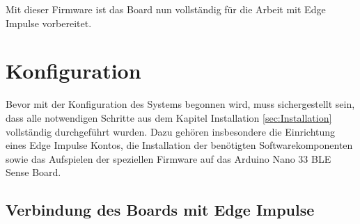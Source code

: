 Mit dieser Firmware ist das Board nun vollständig für die Arbeit mit Edge Impulse vorbereitet. \cite{ArduinoEdgeImpulse:2025}



\chapter{Konfiguration} \label{sec:Konfiguration}

Bevor mit der Konfiguration des Systems begonnen wird, muss sichergestellt sein, dass alle notwendigen Schritte aus dem Kapitel Installation \ref{sec:Installation} vollständig durchgeführt wurden. Dazu gehören insbesondere die Einrichtung eines Edge Impulse Kontos, die Installation der benötigten Softwarekomponenten sowie das Aufspielen der speziellen Firmware auf das Arduino Nano 33 BLE Sense Board. \cite{ArduinoEdgeImpulse:2025}

\section{Verbindung des Boards mit Edge Impulse}

